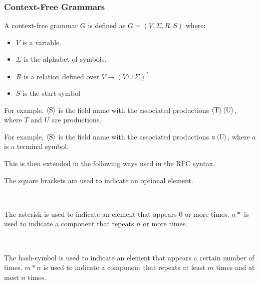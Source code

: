 \subsubsection{Context-Free Grammars}
A context-free grammar $G$ is defined as $G=\left(V,\Sigma, R,S\right)$ where:
\begin{itemize}
\item $V$ is a variable.
\item $\Sigma$ is the alphabet of symbols.
\item $R$ is a relation defined over $V\rightarrow \left(V\cup\Sigma\right)^*$
\item $S$ is the start symbol
\end{itemize}

For example, $\langle \text S \rangle$ is the field name with the associated
productions $\langle \text T \rangle \, \langle \text U \rangle$, where $T$ and
$U$ are productions.

\begin{bnf*}
\end{bnf*}

For example, $\langle \text S \rangle$ is the field name with the associated
productions $a \, \langle \text U \rangle$, where $a$ is a terminal symbol.

\begin{bnf*}
\end{bnf*}
This is then extended in the following ways used in the RFC syntax.

The square brackets are used to indicate an optional element.
\begin{bnf*}
\\
\end{bnf*}

The asterisk is used to indicate an element that appears 0 or more times. $n*$
is used to indicate a component that repeats $n$ or more times.

\begin{bnf*}
\\
\end{bnf*}

The hash-symbol is used to indicate an element that appears a certain number of
times. $m*n$ is used to indicate a component that repeats at least $m$ times and
at most $n$ times.

